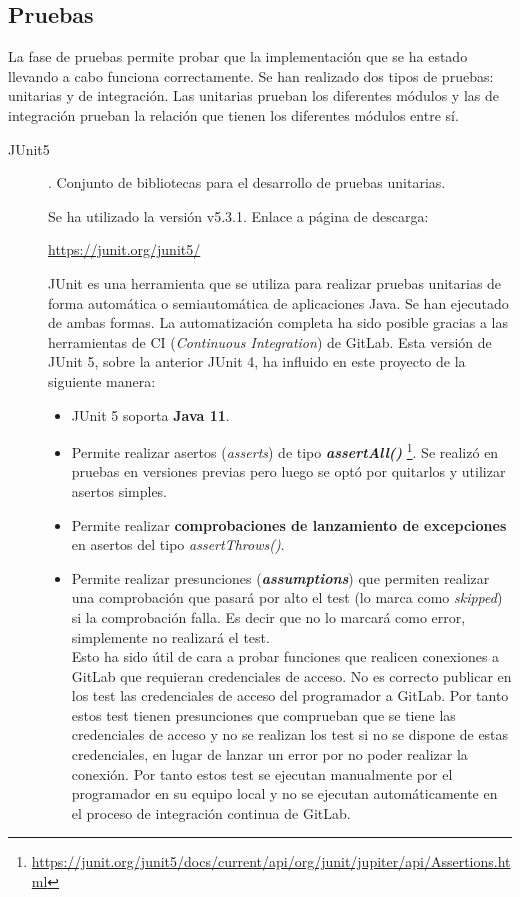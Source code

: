 \subsection{Pruebas}
La fase de pruebas permite probar que la implementación que se ha estado llevando a cabo funciona correctamente. Se han realizado dos tipos de pruebas: unitarias y de integración. Las unitarias prueban los diferentes módulos y las de integración prueban la relación que tienen los diferentes módulos entre sí.
\begin{description}
	\item[JUnit5]. Conjunto de bibliotecas para el desarrollo de pruebas unitarias. 
	
		Se ha utilizado la versión  v5.3.1. Enlace a página de descarga:
		
		\url{https://junit.org/junit5/}
		
		JUnit es una herramienta que se utiliza para realizar pruebas unitarias de forma automática o semiautomática de aplicaciones Java. Se han ejecutado de ambas formas. La automatización completa ha sido posible gracias a las herramientas de CI (\textit{Continuous Integration}) de GitLab.
		Esta versión de JUnit 5, sobre la anterior JUnit 4, ha influido en este proyecto de la siguiente manera:
		\begin{itemize}
			\item JUnit 5 soporta \textbf{Java 11}.
			
			\item Permite realizar asertos (\textit{asserts}) de tipo \textit{\textbf{assertAll()}} \footnote{\url{https://junit.org/junit5/docs/current/api/org/junit/jupiter/api/Assertions.html}}. Se realizó en pruebas en versiones previas pero luego se optó por quitarlos y utilizar asertos simples.
			
			\item Permite realizar \textbf{comprobaciones de lanzamiento de excepciones} en asertos del tipo \textit{assertThrows()}.
			
			\item Permite realizar presunciones (\textit{\textbf{assumptions}}) que permiten realizar una comprobación que pasará por alto el test (lo marca como \textit{skipped}) si la comprobación falla. Es decir que no lo marcará como error, simplemente no realizará el test. \\Esto ha sido útil de cara a probar funciones que realicen conexiones a GitLab que requieran credenciales de acceso. No es correcto publicar en los test las credenciales de acceso del programador a GitLab. Por tanto estos test tienen presunciones que comprueban que se tiene las credenciales de acceso y no se realizan los test si no se dispone de estas credenciales, en lugar de lanzar un error por no poder realizar la conexión. Por tanto estos test se ejecutan manualmente por el programador en su equipo local y no se ejecutan automáticamente en el proceso de integración continua de GitLab.
			

\end{itemize}
\end{description}
